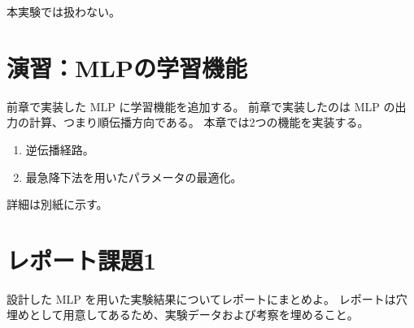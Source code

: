 本実験では扱わない。

\section{演習：MLPの学習機能}

前章で実装した MLP に学習機能を追加する。
前章で実装したのは MLP の出力の計算、つまり順伝播方向である。
本章では2つの機能を実装する。

\begin{enumerate}
    \item 逆伝播経路。
    \item 最急降下法を用いたパラメータの最適化。
\end{enumerate}

詳細は別紙に示す。

\section{レポート課題1}

設計した MLP を用いた実験結果についてレポートにまとめよ。
レポートは穴埋めとして用意してあるため、実験データおよび考察を埋めること。

